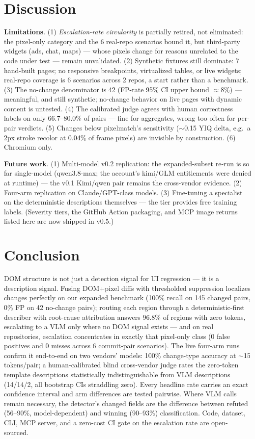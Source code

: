 \documentclass[10pt,twocolumn,letterpaper]{article}
\begin{document}
\section{Discussion}

\textbf{Limitations}. (1) \textit{Escalation-rate circularity} is partially retired, not eliminated: the pixel-only category and the 6 real-repo scenarios bound it, but third-party widgets (ads, chat, maps) — whose pixels change for reasons unrelated to the code under test — remain unvalidated. (2) Synthetic fixtures still dominate: 7 hand-built pages; no responsive breakpoints, virtualized tables, or live widgets; real-repo coverage is 6 scenarios across 2 repos, a start rather than a benchmark. (3) The no-change denominator is 42 (FP-rate 95\% CI upper bound $\approx$8\%) — meaningful, and still synthetic; no-change behavior on live pages with dynamic content is untested. (4) The calibrated judge agrees with human correctness labels on only 66.7--80.0\% of pairs — fine for aggregates, wrong too often for per-pair verdicts. (5) Changes below pixelmatch's sensitivity ($\sim$0.15 YIQ delta, e.g.\ a 2px stroke recolor at 0.04\% of frame pixels) are invisible by construction. (6) Chromium only.

\textbf{Future work}. (1) Multi-model v0.2 replication: the expanded-subset re-run is so far single-model (qwen3.8-max; the account's kimi/GLM entitlements were denied at runtime) — the v0.1 Kimi/qwen pair remains the cross-vendor evidence. (2) Four-arm replication on Claude/GPT-class models. (3) Fine-tuning a specialist on the deterministic descriptions themselves — the tier provides free training labels. (Severity tiers, the GitHub Action packaging, and MCP image returns listed here are now shipped in v0.5.)

\section{Conclusion}

DOM structure is not just a detection signal for UI regression — it is a description signal. Fusing DOM+pixel diffs with thresholded suppression localizes changes perfectly on our expanded benchmark (100\% recall on 145 changed pairs, 0\% FP on 42 no-change pairs); routing each region through a deterministic-first describer with root-cause attribution answers 96.8\% of regions with zero tokens, escalating to a VLM only where no DOM signal exists — and on real repositories, escalation concentrates in exactly that pixel-only class (0 false positives and 0 misses across 6 commit-pair scenarios). The live four-arm runs confirm it end-to-end on two vendors' models: 100\% change-type accuracy at ${\sim}$15 tokens/pair; a human-calibrated blind cross-vendor judge rates the zero-token template descriptions statistically indistinguishable from VLM descriptions (14/14/2, all bootstrap CIs straddling zero). Every headline rate carries an exact confidence interval and arm differences are tested pairwise. Where VLM calls remain necessary, the detector's changed fields are the difference between refuted (56--90\%, model-dependent) and winning (90--93\%) classification. Code, dataset, CLI, MCP server, and a zero-cost CI gate on the escalation rate are open-sourced.
\end{document}
